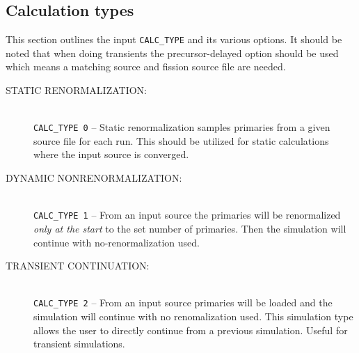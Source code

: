 \documentclass{article}
\begin{document}
\subsection{Calculation types}
This section outlines the input \texttt{CALC\_TYPE} and its various options. It should be noted that when doing transients the precursor-delayed option should be used which means a matching source and fission source file are needed.
\begin{description}
    \item[STATIC RENORMALIZATION:] \hfill \\
    \texttt{CALC\_TYPE 0} -- Static renormalization samples primaries from a given source file for each run. This should be utilized for static calculations where the input source is converged.
    \item[DYNAMIC NONRENORMALIZATION:] \hfill \\
    \texttt{CALC\_TYPE 1} -- From an input source the primaries will be renormalized  \textit{only at the start} to the set number of primaries. Then the simulation will continue with no-renormalization used.
    \item[TRANSIENT CONTINUATION:] \hfill \\
    \texttt{CALC\_TYPE 2} -- From an input source primaries will be loaded and the simulation will continue with no renomalization used. This simulation type allows the user to directly continue from a previous simulation. Useful for transient simulations.
    
\end{description}
\end{document}
